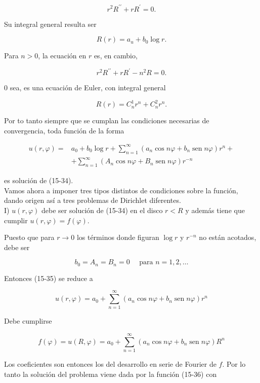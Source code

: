 \documentclass[10pt]{article}
\theoremstyle{plain}
\theoremstyle{definition}
\theoremstyle{remark}
\begin{document}
$$
r^{2} R^{\prime \prime}+r R^{\prime}=0 .
$$

Su integral general resulta ser

$$
R(r)=a_{u}+b_{0} \log r .
$$

Para $n>0$, la ecuación en $r$ es, en cambio,

$$
r^{2} R^{\prime \prime}+r R^{\prime}-n^{2} R=0 .
$$

0 sea, es una ecuación de Euler, con integral general

$$
R(r)=C_{n}^{1} r^{n}+C_{n}^{2} r^{n} .
$$

Por to tanto siempre que se cumplan las condiciones necesarias de\\
convergencia, toda función de la forma


\begin{align*}
u(r, \varphi)= & a_{0}+b_{0} \log r+\sum_{n=1}^{\infty}\left(a_{n} \cos n \varphi+b_{n} \operatorname{sen} n \varphi\right) r^{n}+ \\
& +\sum_{n=1}^{\infty}\left(A_{n} \cos n \varphi+B_{n} \operatorname{sen} n \varphi\right) r^{-n} \tag{15-35}
\end{align*}


es solución de (15-34).\\
Vamos ahora a imponer tres tipos distintos de condiciones sobre la función, dando origen así a tres problemas de Dirichlet diferentes.\\
I) $u(r, \varphi)$ debe ser solución de (15-34) en el disco $r<R$ y además tiene que cumplir $u(r, \varphi)=f(\varphi)$.

Puesto que para $r \rightarrow 0$ los términos donde figuran $\log r$ y $r^{-n}$ no están acotados, debe ser

$$
b_{0}=A_{n}=B_{n}=0 \quad \text { para } n=1,2, \ldots
$$

Entonces (15-35) se reduce a


\begin{equation*}
u(r, \varphi)=a_{0}+\sum_{n=1}^{\infty}\left(a_{n} \cos n \varphi+b_{n} \operatorname{sen} n \varphi\right) r^{n} \tag{15-36}
\end{equation*}


Debe cumplirse

$$
f(\varphi)=u(R, \varphi)=a_{0}+\sum_{n=1}^{\infty}\left(a_{n} \cos n \varphi+b_{n} \operatorname{sen} n \varphi\right) R^{n}
$$

Los coeficientes son entonces los del desarrollo en serie de Fourier de $f$. Por lo tanto la solución del problema viene dada por la función (15-36) con
\end{document}
